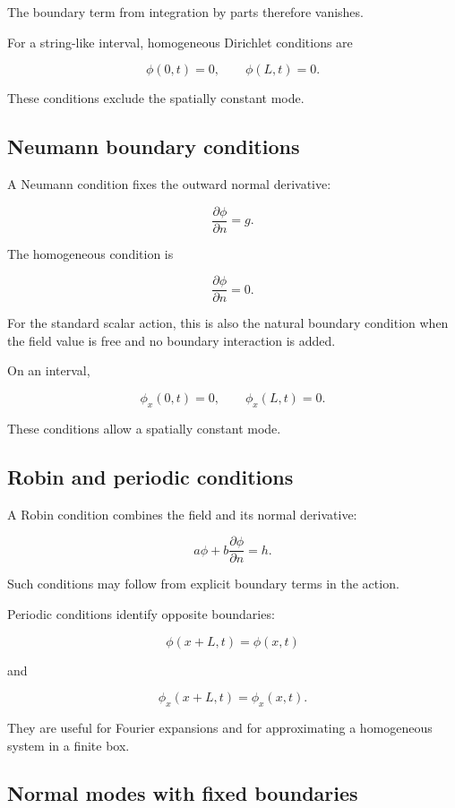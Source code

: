 The boundary term from integration by parts therefore vanishes.

For a string-like interval, homogeneous Dirichlet conditions are

\[
\phi(0,t)=0,
\qquad
\phi(L,t)=0.
\]

These conditions exclude the spatially constant mode.

\subsection{Neumann boundary conditions}

A Neumann condition fixes the outward normal derivative:

\[
\boxed{
\frac{\partial\phi}{\partial n}
=g
}.
\]

The homogeneous condition is

\[
\frac{\partial\phi}{\partial n}=0.
\]

For the standard scalar action, this is also the natural boundary condition when the field value is free and no boundary interaction is added.

On an interval,

\[
\phi_{x}(0,t)=0,
\qquad
\phi_{x}(L,t)=0.
\]

These conditions allow a spatially constant mode.

\subsection{Robin and periodic conditions}

A Robin condition combines the field and its normal derivative:

\[
\boxed{
a\phi
+
b
\frac{\partial\phi}{\partial n}
=h
}.
\]

Such conditions may follow from explicit boundary terms in the action.

Periodic conditions identify opposite boundaries:

\[
\boxed{
\phi(x+L,t)=\phi(x,t)
}
\]

and

\[
\phi_{x}(x+L,t)=\phi_{x}(x,t).
\]

They are useful for Fourier expansions and for approximating a homogeneous system in a finite box.

\subsection{Normal modes with fixed boundaries}

